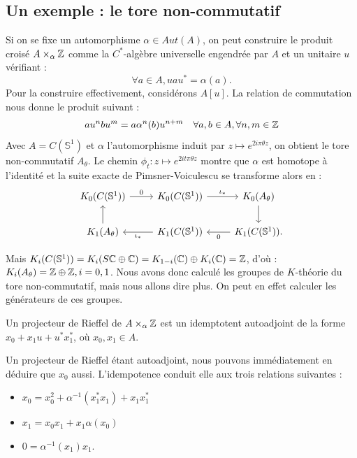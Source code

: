 \subsection{Un exemple : le tore non-commutatif}
 
Si on se fixe un automorphisme $\alpha \in Aut(A)$, on peut construire le produit croisé $A\times_\alpha \mathbb Z$ comme la $C^*$-algèbre universelle engendrée par $A$ et un unitaire $u$ vérifiant :
\[\forall a \in A, uau^*=\alpha(a).\]
Pour la construire effectivement, considérons $A[u]$. La relation de commutation nous donne le produit suivant :
\[au^n bu^m = a \alpha^n(b)u^{n+m}\quad \forall a,b \in A, \forall n,m \in \mathbb Z\]
Avec $A=C(\mathbb S^1)$ et $\alpha$ l'automorphisme induit par $z\mapsto e^{2i\pi\theta z}$, on obtient le tore non-commutatif $A_\theta$. Le chemin $\phi_t: z\mapsto e^{2it\pi\theta z}$ montre que $\alpha$ est homotope à l'identité et la suite exacte de Pimsner-Voiculescu se transforme alors en :
\[\begin{tikzcd}
 K_0(C(\mathbb S^1)) \arrow{r}{0} & K_0(C(\mathbb S^1))  \arrow{r}{\iota_*}  &    K_0(A_\theta)  \arrow{d}  \\
 K_1(A_\theta) \arrow{u} & K_1(C(\mathbb S^1))  \arrow{l}{\iota_*} &    K_1(C(\mathbb S^1)) \arrow{l}{0}.
\end{tikzcd}\]

Mais $K_i(C(\mathbb S^1))=K_i(S\mathbb C \oplus \mathbb C)=K_{1-i}(\mathbb C)\oplus K_i(\mathbb C)=\mathbb Z$, d'où : $K_i(A_\theta)=\mathbb Z \oplus\mathbb Z, i=0,1$. Nous avons donc calculé les groupes de $K$-théorie du tore non-commutatif, mais nous allons dire plus. On peut en effet calculer les générateurs de ces groupes. \\

\begin{definition}
Un projecteur de Rieffel de $A\times_\alpha \mathbb Z$ est un idemptotent autoadjoint de la forme $x_0+x_1 u +u^*x_1^*$, où $x_0,x_1 \in A$.\\
\end{definition}
Un projecteur de Rieffel étant autoadjoint, nous pouvons immédiatement en déduire que $x_0$ aussi. L'idempotence conduit elle aux trois relations suivantes : %
\begin{itemize}
\item $x_0=x_0^2+\alpha^{-1}(x_1^* x_1)+x_1 x_1^*$
\item $x_1= x_0 x_1 +x_1 \alpha(x_0)$
\item $0=\alpha^{-1}(x_1)x_1$.
\end{itemize}

